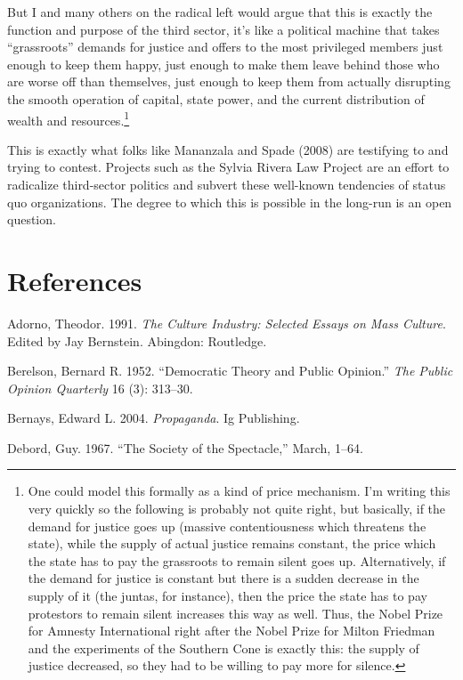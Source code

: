 \documentclass[12pt,book]{article}
\begin{document}
But I and many others on the radical left would argue that this is
exactly the function and purpose of the third sector, it's like a
political machine that takes ``grassroots'' demands for justice and
offers to the most privileged members just enough to keep them happy,
just enough to make them leave behind those who are worse off than
themselves, just enough to keep them from actually disrupting the smooth
operation of capital, state power, and the current distribution of
wealth and resources.\footnote{One could model this formally as a kind
  of price mechanism. I'm writing this very quickly so the following is
  probably not quite right, but basically, if the demand for justice
  goes up (massive contentiousness which threatens the state), while the
  supply of actual justice remains constant, the price which the state
  has to pay the grassroots to remain silent goes up. Alternatively, if
  the demand for justice is constant but there is a sudden decrease in
  the supply of it (the juntas, for instance), then the price the state
  has to pay protestors to remain silent increases this way as well.
  Thus, the Nobel Prize for Amnesty International right after the Nobel
  Prize for Milton Friedman and the experiments of the Southern Cone is
  exactly this: the supply of justice decreased, so they had to be
  willing to pay more for silence.}

This is exactly what folks like Mananzala and Spade (2008) are
testifying to and trying to contest. Projects such as the Sylvia Rivera
Law Project are an effort to radicalize third-sector politics and
subvert these well-known tendencies of status quo organizations. The
degree to which this is possible in the long-run is an open question.

\pagebreak

\section*{References}\label{references}

Adorno, Theodor. 1991. \emph{The Culture Industry: Selected Essays on
Mass Culture}. Edited by Jay Bernstein. Abingdon: Routledge.

Berelson, Bernard R. 1952. ``Democratic Theory and Public Opinion.''
\emph{The Public Opinion Quarterly} 16 (3): 313--30.

Bernays, Edward L. 2004. \emph{Propaganda}. Ig Publishing.

Debord, Guy. 1967. ``The Society of the Spectacle,'' March, 1--64.
\end{document}
